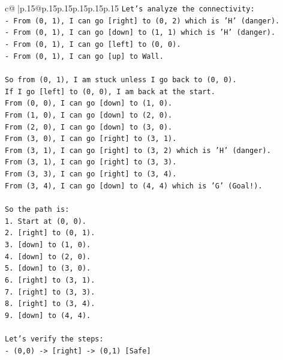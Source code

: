 \documentclass{article}
\begin{document}
{\begin{supertabular}{c@{$\;$}|p{.15\linewidth}@{}p{.15\linewidth}p{.15\linewidth}p{.15\linewidth}p{.15\linewidth}p{.15\linewidth}}
{{{\texttt{Let's analyze the connectivity:} \\
\texttt{{-} From (0, 1), I can go {[}right{]} to (0, 2) which is 'H' (danger).} \\
\texttt{{-} From (0, 1), I can go {[}down{]} to (1, 1) which is 'H' (danger).} \\
\texttt{{-} From (0, 1), I can go {[}left{]} to (0, 0).} \\
\texttt{{-} From (0, 1), I can go {[}up{]} to Wall.} \\
\\ 
\texttt{So from (0, 1), I am stuck unless I go back to (0, 0).} \\
\texttt{If I go {[}left{]} to (0, 0), I am back at the start.} \\
\texttt{From (0, 0), I can go {[}down{]} to (1, 0).} \\
\texttt{From (1, 0), I can go {[}down{]} to (2, 0).} \\
\texttt{From (2, 0), I can go {[}down{]} to (3, 0).} \\
\texttt{From (3, 0), I can go {[}right{]} to (3, 1).} \\
\texttt{From (3, 1), I can go {[}right{]} to (3, 2) which is 'H' (danger).} \\
\texttt{From (3, 1), I can go {[}right{]} to (3, 3).} \\
\texttt{From (3, 3), I can go {[}right{]} to (3, 4).} \\
\texttt{From (3, 4), I can go {[}down{]} to (4, 4) which is 'G' (Goal!).} \\
\\ 
\texttt{So the path is:} \\
\texttt{1. Start at (0, 0).} \\
\texttt{2. {[}right{]} to (0, 1).} \\
\texttt{3. {[}down{]} to (1, 0).} \\
\texttt{4. {[}down{]} to (2, 0).} \\
\texttt{5. {[}down{]} to (3, 0).} \\
\texttt{6. {[}right{]} to (3, 1).} \\
\texttt{7. {[}right{]} to (3, 3).} \\
\texttt{8. {[}right{]} to (3, 4).} \\
\texttt{9. {[}down{]} to (4, 4).} \\
\\ 
\texttt{Let's verify the steps:} \\
\texttt{{-} (0,0) {-}> {[}right{]} {-}> (0,1) {[}Safe{]}} \\
}}}
\end{supertabular}}
\end{document}
